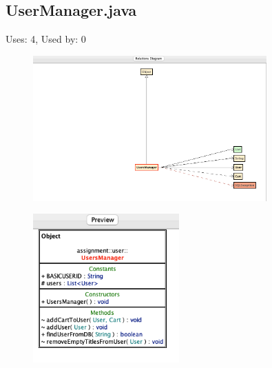 \documentclass{article}
\begin{document}
\subsection{UserManager.java}
Uses: 4, Used by: 0
\begin{figure}[H]
    \centering
    \includegraphics[width=0.8\textwidth]{img/userManagerDiagram.png}
\end{figure}
\begin{figure}[H]
    \centering
    \includegraphics[width=0.5\textwidth]{img/userManagerPreview.png}
\end{figure}
\end{document}
